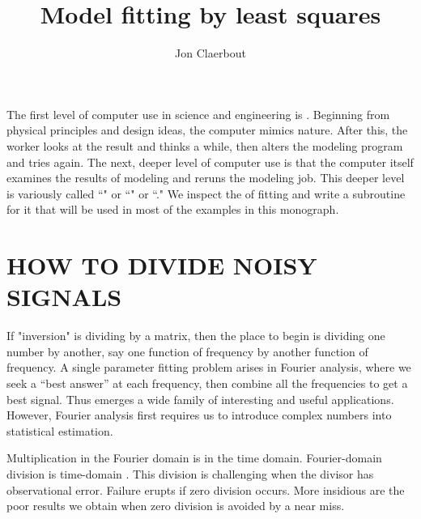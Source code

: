 
\title{Model fitting by least squares}
\author{Jon Claerbout}

\label{paper:lsq}

\def\ff{{\bf f}}
\def\dd{{\bf d}}

\par
The first level of computer use in science and engineering is .
Beginning from physical principles and design ideas,
the computer mimics nature.
After this, the worker looks at the result and thinks a while,
then alters the modeling program and tries again.
The next, deeper level of computer use is that the computer itself
examines the results of modeling and reruns the modeling job.
This deeper level
is variously called
``" or
``" or
``."
We inspect the  of fitting
and write a subroutine for it that will be used in most of
the examples in this monograph.

\section{HOW TO DIVIDE NOISY SIGNALS}
If "inversion" is dividing by a matrix,
then the place to begin is dividing one number by another,
say one function of frequency by another function of frequency.
A single parameter fitting problem arises in Fourier analysis,
where we seek a ``best answer'' at each frequency,
then combine all the frequencies to get a best signal.
Thus emerges a wide family of interesting and useful applications.
However, Fourier analysis first requires us to introduce complex numbers
into statistical estimation.
\par
Multiplication in the Fourier domain is  in the time domain.
Fourier-domain division is time-domain .
This division is challenging when the divisor has observational error.
Failure erupts if zero division occurs.
More insidious are the poor results we obtain
when zero division is avoided by a near miss.


